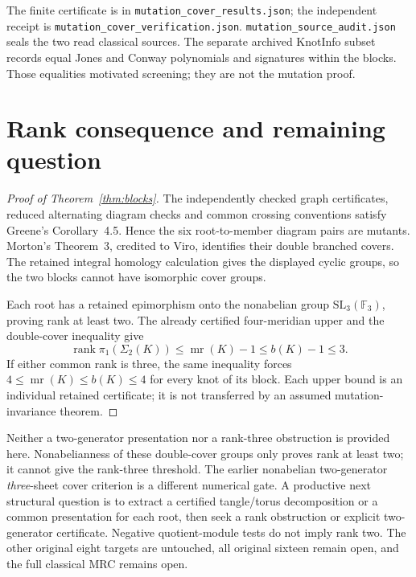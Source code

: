 \documentclass[11pt]{article}
\newcommand{\rank}{\operatorname{rank}}
\newcommand{\mr}{\operatorname{mr}}
\begin{document}
The finite certificate is in \texttt{mutation\_cover\_results.json};
the independent receipt is \texttt{mutation\_cover\_verification.json}.
\texttt{mutation\_source\_audit.json} seals the two read classical
sources. The separate archived KnotInfo subset records equal Jones
and Conway polynomials and signatures within the blocks. Those
equalities motivated screening; they are not the mutation proof.

\section{Rank consequence and remaining question}

\begin{proof}[Proof of Theorem~\ref{thm:blocks}]
The independently checked graph certificates, reduced alternating
diagram checks and common crossing conventions satisfy Greene's
Corollary~4.5. Hence the six root-to-member diagram pairs are mutants.
Morton's Theorem~3, credited to Viro, identifies their double branched
covers. The retained integral homology calculation gives the displayed
cyclic groups, so the two blocks cannot have isomorphic cover groups.

Each root has a retained epimorphism onto the nonabelian group
$\mathrm{SL}_3(\mathbb F_3)$, proving rank at least two. The already
certified four-meridian upper and the double-cover inequality give
\[
 \rank\pi_1(\Sigma_2(K))\le\mr(K)-1\le b(K)-1\le3.
\]
If either common rank is three, the same inequality forces
$4\le\mr(K)\le b(K)\le4$ for every knot of its block.
Each upper bound is an individual retained certificate; it is not
transferred by an assumed mutation-invariance theorem.
\end{proof}

Neither a two-generator presentation nor a rank-three obstruction is
provided here. Nonabelianness of these double-cover groups only proves
rank at least two; it cannot give the rank-three threshold. The earlier
nonabelian two-generator \emph{three}-sheet cover criterion is a
different numerical gate. A productive next structural question is to
extract a certified tangle/torus decomposition or a common presentation
for each root, then seek a rank obstruction or explicit two-generator
certificate. Negative quotient-module tests do not imply rank two.
The other original eight targets are untouched, all original sixteen
remain open, and the full classical MRC remains open.
\end{document}

